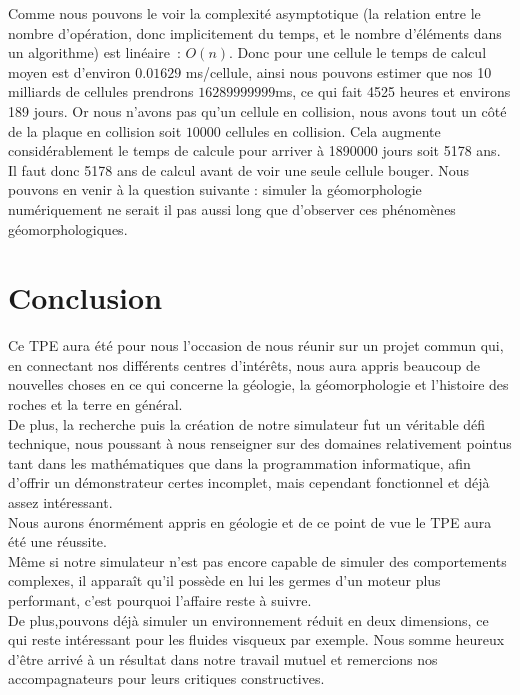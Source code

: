 \documentclass[a4paper,11pt]{article}
\begin{document}
Comme nous pouvons le voir la complexité asymptotique (la relation entre le nombre d'opération, donc implicitement du temps, et le nombre d'éléments dans un algorithme) est linéaire~: $O(n)$.
Donc pour une cellule le temps de calcul moyen est d'environ $0.01629$ ms/cellule, ainsi nous pouvons estimer que nos 10 milliards de cellules prendrons $16289999999$ms, ce qui fait 4525 heures et environs 189 jours.
Or nous n'avons pas qu'un cellule en collision, nous avons tout un côté de la plaque en collision soit $10000$ cellules en collision.
Cela augmente considérablement le temps de calcule pour arriver à 1890000 jours soit 5178 ans.
Il faut donc 5178 ans de calcul avant de voir une seule cellule bouger.
Nous pouvons en venir à la question suivante : simuler la géomorphologie numériquement ne serait il pas aussi long que d'observer ces phénomènes géomorphologiques.

\section{Conclusion}

Ce TPE aura été pour nous l'occasion de nous réunir sur un projet commun qui, en connectant nos différents centres d’intérêts, nous aura appris beaucoup de nouvelles choses en ce qui concerne la géologie, la géomorphologie et l'histoire des roches et la terre en général. \\
De plus, la recherche puis la création de notre simulateur fut un véritable défi technique, nous poussant à nous renseigner sur des domaines relativement pointus tant dans les mathématiques que dans la programmation informatique, afin d'offrir un démonstrateur certes incomplet, mais cependant fonctionnel et déjà assez intéressant. \\
Nous aurons énormément appris en géologie et de ce point de vue le TPE aura été une réussite. \\
Même si notre simulateur n'est pas encore capable de simuler des comportements complexes, il apparaît qu'il possède en lui les germes d'un moteur plus performant, c'est pourquoi l'affaire reste à suivre. \\ De plus,pouvons déjà simuler un environnement réduit en deux dimensions, ce qui reste intéressant pour les fluides visqueux par exemple. Nous somme heureux d'être arrivé à un résultat dans notre travail mutuel et remercions nos accompagnateurs pour leurs critiques constructives.
\end{document}
